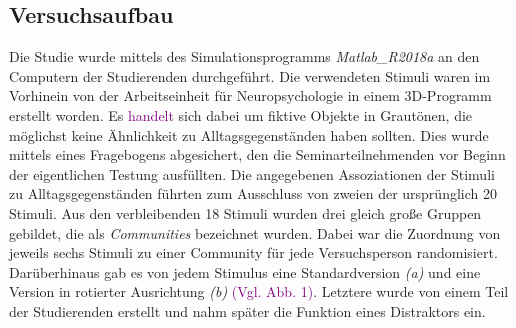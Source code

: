 \subsection{Versuchsaufbau}
Die Studie wurde mittels des Simulationsprogramms \textit{Matlab\_R2018a} an den Computern der Studierenden durchgeführt. Die verwendeten Stimuli waren im Vorhinein von der Arbeitseinheit für Neuropsychologie in einem 3D-Programm  erstellt worden. Es \textcolor{purple}{handelt} sich dabei um fiktive Objekte in Grautönen, die möglichst keine Ähnlichkeit zu Alltagsgegenständen haben sollten. Dies wurde mittels eines Fragebogens abgesichert, den die Seminarteilnehmenden vor Beginn der eigentlichen Testung ausfüllten. Die angegebenen Assoziationen der Stimuli zu Alltagsgegenständen führten zum Ausschluss von zweien der ursprünglich 20 Stimuli.
Aus den verbleibenden 18 Stimuli wurden drei gleich große Gruppen gebildet, die als \textit{Communities} bezeichnet wurden. Dabei war die Zuordnung von jeweils sechs Stimuli zu einer Community für jede Versuchsperson randomisiert.
Darüberhinaus gab es von jedem Stimulus eine Standardversion \textit{(a)} und eine Version in rotierter Ausrichtung \textit{(b)} \textcolor{purple}{(Vgl. Abb. 1)}. Letztere wurde von einem Teil der Studierenden erstellt und nahm später die Funktion eines Distraktors ein.


